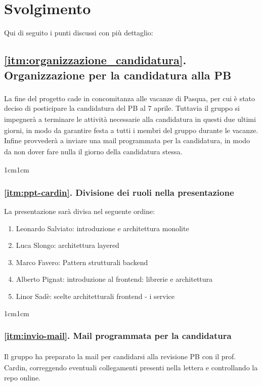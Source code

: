 \documentclass[a4paper,12pt]{article}
\begin{document}
\newpage
\section{Svolgimento}
Qui di seguito i punti discussi con più dettaglio:

\subsection*{\ref{itm:organizzazione_candidatura}. Organizzazione per la candidatura\textsubscript{} alla PB\textsubscript{}}
La fine del progetto cade in concomitanza alle vacanze di Pasqua, per cui è stato deciso di posticipare la candidatura\textsubscript{} del PB\textsubscript{} al 7 aprile. Tuttavia il gruppo si impegnerà a terminare le attività necessarie alla candidatura\textsubscript{} in questi due ultimi giorni, in modo da garantire festa a tutti i membri del gruppo durante le vacanze.\\
Infine provvederà a inviare una mail programmata per la candidatura\textsubscript{}, in modo da non dover fare nulla il giorno della candidatura\textsubscript{} stessa.
\begin{adjustwidth}{1cm}{1cm} %
    \subsubsection*{\ref{itm:ppt-cardin}. Divisione dei ruoli nella presentazione}
    La presentazione sarà divisa nel seguente ordine:
    \begin{enumerate}
      \item Leonardo Salviato: introduzione e architettura monolite
      \item Luca Slongo: architettura layered
      \item Marco Favero: Pattern strutturali backend
      \item Alberto Pignat: introduzione al frontend: librerie e architettura
      \item Linor Sadè: scelte architetturali frontend - i service
    \end{enumerate}
\end{adjustwidth}
\begin{adjustwidth}{1cm}{1cm} %
    \subsubsection*{\ref{itm:invio-mail}. Mail programmata per la candidatura\textsubscript{}}
    
    Il gruppo ha preparato la mail per candidarsi alla revisione PB\textsubscript{} con il prof. Cardin, correggendo eventuali collegamenti presenti nella lettera e controllando la repo online.
\end{adjustwidth}
\end{document}
